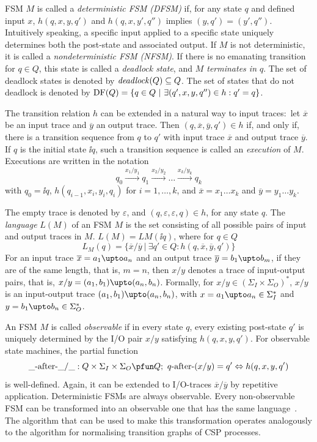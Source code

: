 FSM $M$ is called a \emph{deterministic FSM (DFSM)} if, for any state $q$ and
defined input $x$, $h(q,x,y,q')$ and $h(q,x,y',q'')$ implies $(y,q') =
(y',q'')$. Intuitively speaking, a specific input applied to a specific state
uniquely determines both the post-state and associated output. If $M$ is not
deterministic, it is called a \emph{nondeterministic FSM (NFSM)}. If there is
no emanating transition for $q\in Q$, this state is called a \emph{deadlock
state}, and \emph{$M$ terminates in $q$}. The set of deadlock states is
denoted by ${\it deadlock}(Q)\subseteq Q$. The set of states that do not deadlock
is denoted by $\text{DF}(Q) = \{ q\in Q~|~\exists (q',x,y,q'')\in h: q' = q \}$.

The transition relation $h$ can be extended in a natural way to input
traces:~let $\overline{x}$ be an input trace and $\overline{y}$ an output
trace. Then $(q,\overline{x},\overline{y},q')\in h$ if, and only if, there is
a transition sequence from $q$ to $q'$ with input trace $\overline{x}$ and
output trace $\overline{y}$. If $q$ is the initial state $\ii{q}$, such a
transition sequence is called an \emph{execution} of $M$. Executions are
written in the notation
$$
q_0 \xrightarrow{x_1/y_1} q_1 \xrightarrow{x_2/y_2} \dots \xrightarrow{x_{k}/y_{k}} q_{k}
$$
with $q_0 = \ii{q}$, $h(q_{i-1},x_i,y_i,q_{i})$ for $i = 1,\dots,k$, and
$\overline{x} = x_1\dots x_k$ and $\overline{y} = y_1\dots y_k$.

The empty trace is denoted by $\varepsilon$, and
$(q,\varepsilon,\varepsilon,q)\in h$, for any state $q$. The \emph{language}
$L(M)$ of an FSM $M$ is the set consisting of all possible pairs of input and
output traces in $M$. $L(M)= LM(\ii{q})$, where for $q\in Q$
%
$$
  L_M(q)=\{\overline{x}/\overline{y}~|~\exists q'\in Q: h(q,\overline{x},\overline{y},q')\}
$$
%
For an input trace $\overline{x} = a_1\upto a_n$ and an output trace
$\overline{y} = b_1\upto b_m$, if they are of the same length, that is, $m =
 n$, then $x/y$ denotes a trace of input-output pairs, that is,
$x/y =(a_1,b_1)\upto(a_n,b_n)$. Formally, for $x/y \in (\Sigma_I\times
\Sigma_O)^*$, $x/y$ is an input-output trace $(a_1,b_1)\upto(a_n,b_n)$, with
$x=a_1\upto a_n \in \Sigma_I^*$ and $y=b_1\upto b_n \in \Sigma_O^*$.

An FSM $M$ is called \emph{observable} if in every state $q$, every existing
post-state $q'$ is uniquely determined by the I/O pair $x/y$ satisfying
$h(q,x,y,q')$. For observable state machines, the partial function
$$
\_ \after\_ /\_ : Q\times\Sigma_I\times \Sigma_O \pfun Q;\
q\after(x/y) = q' \Leftrightarrow h(q,x,y,q')
$$
is well-defined. Again, it can be extended to I/O-traces $\overline
x/\overline y$ by repetitive application. Deterministic FSMs are always
observable. Every non-observable FSM can be transformed into an observable
one that has the same language~\cite{PeleskaHuangLectureNotesMBT}. The
algorithm that can be used to make this transformation operates analogously
to the algorithm for normalising transition graphs of CSP processes.

